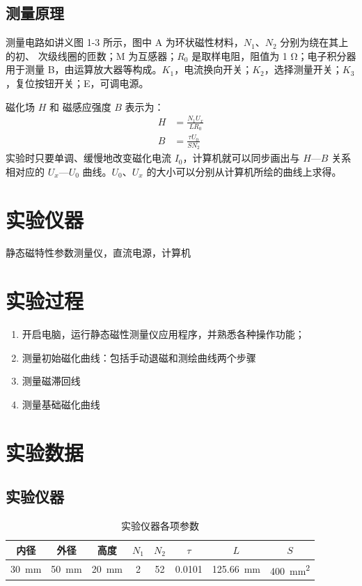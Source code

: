 \documentclass[a4paper,utf8]{article}
\begin{document}
    \subsection{测量原理}
        测量电路如讲义图 1-3 所示，图中 A 为环状磁性材料，$N_1$、$N_2$ 分别为绕在其上的初、 次级线圈的匝数；M 为互感器；$R_0$ 是取样电阻，阻值为 1 \unit{\ohm}；电子积分器用于测量 B，由运算放大器等构成。$K_1$，电流换向开关；$K_2$，选择测量开关；$K_3$，复位按钮开关；E，可调电源。\par
        磁化场 $H$ 和 磁感应强度 $B$ 表示为：
        \begin{align}
            H&=\frac{N_1 U_x}{L R_0}\label{eq:1}\\
            B&=\frac{\tau U_0}{S N_2}\label{eq:2}
        \end{align}
        实验时只要单调、缓慢地改变磁化电流 $I_0$，计算机就可以同步画出与 $H—B$ 关系相对应的 $U_x—U_0$ 曲线。$U_0$、$U_x$ 的大小可以分别从计算机所绘的曲线上求得。
\section{实验仪器}%
    静态磁特性参数测量仪，直流电源，计算机
\section{实验过程}%
    \begin{enumerate}
        \item 开启电脑，运行静态磁性测量仪应用程序，并熟悉各种操作功能；
        \item 测量初始磁化曲线：包括手动退磁和测绘曲线两个步骤
        \item 测量磁滞回线
        \item 测量基础磁化曲线
    \end{enumerate}

\section{实验数据}
\subsection{实验仪器}
\begin{table}[!ht]
    \caption{实验仪器各项参数}
    \begin{tabular}{*{8}{c}} \toprule
        内径 & 外径 & 高度 & $N_1$ & $N_2$ & $\tau$ & $L$ & $S$ \\ \midrule
        \SI{30}{\mm} & \SI{50}{\mm} & \SI{20}{\mm} & 2 & 52 & 0.0101 & \SI{125.66}{\mm} & \SI{400}{\square\mm} \\ \bottomrule
    \end{tabular}
\end{table}
\end{document}
